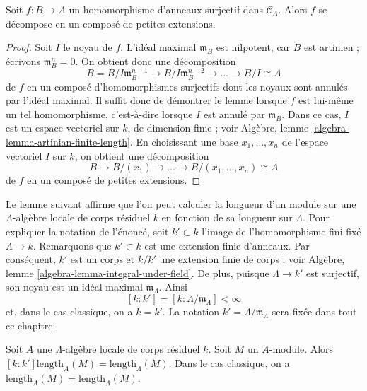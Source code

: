 \begin{lemma}
\label{lemma-factor-small-extension}
Soit $f: B \to A$ un homomorphisme d'anneaux surjectif dans
$\mathcal{C}_\Lambda$. Alors $f$ se décompose en un composé de petites
extensions.
\end{lemma}

\begin{proof}
Soit $I$ le noyau de $f$. L'idéal maximal $\mathfrak{m}_B$ est nilpotent,
car $B$ est artinien ; écrivons $\mathfrak{m}_B^n = 0$. On obtient donc une
décomposition
$$
B = B/I\mathfrak{m}_B^{n-1} \to B/I\mathfrak{m}_B^{n-2} \to
\ldots \to B/I \cong A
$$
de $f$ en un composé d'homomorphismes surjectifs dont les noyaux sont annulés
par l'idéal maximal. Il suffit donc de démontrer le lemme lorsque $f$ est lui-même
un tel homomorphisme, c'est-à-dire lorsque $I$ est annulé par
$\mathfrak{m}_B$. Dans ce cas, $I$ est un espace vectoriel sur $k$, de
dimension finie ; voir Algèbre, lemme
\ref{algebra-lemma-artinian-finite-length}. En choisissant une base
$x_1, \ldots, x_n$ de l'espace vectoriel $I$ sur $k$, on obtient une
décomposition
$$
B \to B/(x_1) \to \ldots \to  B/(x_1, \ldots, x_n) \cong  A
$$
de $f$ en un composé de petites extensions.
\end{proof}

\noindent
Le lemme suivant affirme que l'on peut calculer la longueur d'un module sur
une $\Lambda$-algèbre locale de corps résiduel $k$ en fonction de sa longueur
sur $\Lambda$. Pour expliquer la notation de l'énoncé, soit $k' \subset k$
l'image de l'homomorphisme fini fixé $\Lambda \to k$. Remarquons que
$k' \subset k$ est une extension finie d'anneaux. Par conséquent, $k'$ est un
corps et $k/k'$ une extension finie de corps ; voir Algèbre, lemme
\ref{algebra-lemma-integral-under-field}. De plus, puisque
$\Lambda \to k'$ est surjectif, son noyau est un idéal maximal
$\mathfrak m_\Lambda$. Ainsi
\begin{equation}
\label{equation-k-prime}
[k : k'] = [k : \Lambda/\mathfrak m_\Lambda] < \infty
\end{equation}
et, dans le cas classique, on a $k = k'$. La notation
$k' = \Lambda/\mathfrak m_\Lambda$ sera fixée dans tout ce chapitre.

\begin{lemma}
\label{lemma-length}
Soit $A$ une $\Lambda$-algèbre locale de corps résiduel $k$.
Soit $M$ un $A$-module. Alors
$[k : k'] \text{length}_A(M) = \text{length}_\Lambda(M)$.
Dans le cas classique, on a
$\text{length}_A(M) = \text{length}_\Lambda(M)$.
\end{lemma}

